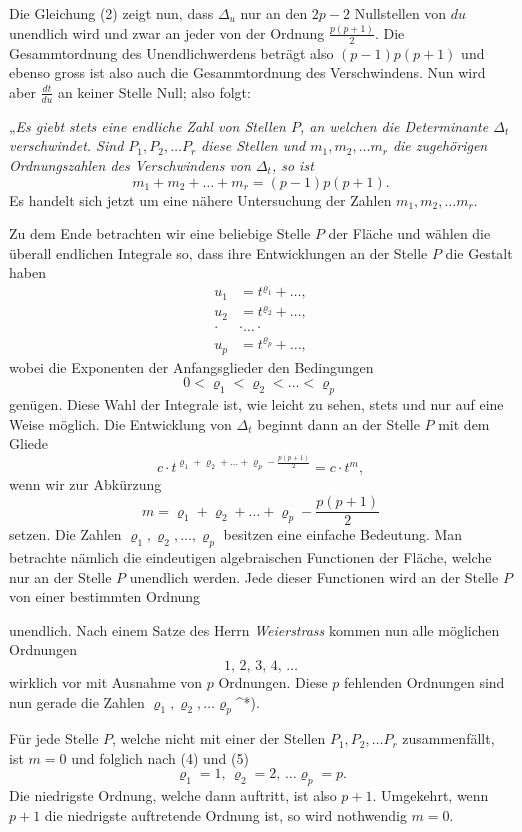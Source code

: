 \documentclass{article}
\begin{document}
Die Gleichung (2) zeigt nun, dass $\Delta_u$ nur an den $2p - 2$ Nullstellen von $du$ unendlich wird und zwar an jeder von der Ordnung $\frac{p(p+1)}{2}$. Die Gesammtordnung des Unendlichwerdens beträgt also $(p-1)p(p+1)$ und ebenso gross ist also auch die Gesammtordnung des Verschwindens. Nun wird aber $\frac{dt}{du}$ an keiner Stelle Null; also folgt:

„\emph{Es giebt stets eine endliche Zahl von Stellen $P$, an welchen die Determinante $\Delta_t$ verschwindet. Sind $P_1, P_2, \dots P_r$ diese Stellen und $m_1, m_2, \dots m_r$ die zugehörigen Ordnungszahlen des Verschwindens von $\Delta_t$, so ist}
\[
m_1 + m_2 + \dots + m_r = (p-1)p(p+1).
\tag{3}
\]
Es handelt sich jetzt um eine nähere Untersuchung der Zahlen $m_1, m_2, \dots m_r$.

Zu dem Ende betrachten wir eine beliebige Stelle $P$ der Fläche und wählen die überall endlichen Integrale so, dass ihre Entwicklungen an der Stelle $P$ die Gestalt haben
\[
\begin{aligned}
u_1 &= t^{\varrho_1} + \dots, \\
u_2 &= t^{\varrho_2} + \dots, \\
\cdot & \cdot \dots \cdot \\
u_p &= t^{\varrho_p} + \dots,
\end{aligned}
\]
wobei die Exponenten der Anfangsglieder den Bedingungen
\[
0 < \varrho_1 < \varrho_2 < \dots < \varrho_p
\tag{4}
\]
genügen. Diese Wahl der Integrale ist, wie leicht zu sehen, stets und nur auf eine Weise möglich. Die Entwicklung von $\Delta_t$ beginnt dann an der Stelle $P$ mit dem Gliede
\[
c \cdot t^{\varrho_1 + \varrho_2 + \dots + \varrho_p - \frac{p(p+1)}{2}} = c \cdot t^m,
\]
wenn wir zur Abkürzung
\[
m = \varrho_1 + \varrho_2 + \dots + \varrho_p - \frac{p(p+1)}{2}
\tag{5}
\]
setzen. Die Zahlen $\varrho_1, \varrho_2, \dots, \varrho_p$ besitzen eine einfache Bedeutung. Man betrachte nämlich die eindeutigen algebraischen Functionen der Fläche, welche nur an der Stelle $P$ unendlich werden. Jede dieser Functionen wird an der Stelle $P$ von einer bestimmten Ordnung

unendlich. Nach einem Satze des Herrn \emph{Weierstrass} kommen nun alle möglichen Ordnungen
\[
1,\, 2,\, 3,\, 4,\, \dots
\]
wirklich vor mit Ausnahme von $p$ Ordnungen. Diese $p$ fehlenden Ordnungen sind nun gerade die Zahlen $\varrho_1, \varrho_2, \dots \varrho_p${}^{*)}.

Für jede Stelle $P$, welche nicht mit einer der Stellen $P_1, P_2, \dots P_r$ zusammenfällt, ist $m = 0$ und folglich nach (4) und (5)
\[
\varrho_1 = 1,\, \varrho_2 = 2,\, \dots \varrho_p = p.
\]
Die niedrigste Ordnung, welche dann auftritt, ist also $p+1$. Umgekehrt, wenn $p+1$ die niedrigste auftretende Ordnung ist, so wird nothwendig $m = 0$.
\end{document}
